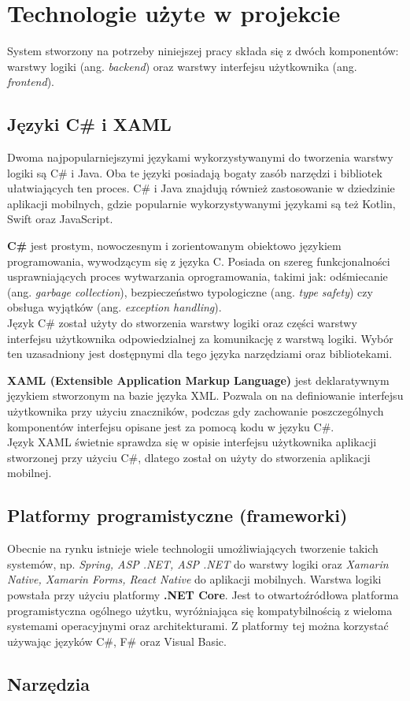 \chapter{Technologie użyte w projekcie}
System stworzony na potrzeby niniejszej pracy składa się z dwóch komponentów: warstwy logiki (ang. \textit{backend})  oraz warstwy interfejsu użytkownika (ang. \textit{frontend}).
\section{Języki C\# i XAML}
Dwoma najpopularniejszymi językami wykorzystywanymi do tworzenia warstwy logiki są C\# i Java. Oba te języki posiadają bogaty zasób narzędzi i bibliotek ułatwiających ten proces. C\# i Java znajdują również zastosowanie w dziedzinie aplikacji mobilnych, gdzie popularnie wykorzystywanymi językami są też Kotlin, Swift oraz JavaScript.

\textbf{C\#} jest prostym, nowoczesnym i zorientowanym obiektowo językiem programowania, wywodzącym się z języka C. Posiada on szereg funkcjonalności usprawniających proces wytwarzania oprogramowania, takimi jak: odśmiecanie (ang. \textit{garbage collection}), bezpieczeństwo typologiczne (ang. \textit{type safety}) czy obsługa wyjątków (ang. \textit{exception handling}).\cite{wagner_wenzel_latham_onderka_2016}\\
Język C\# został użyty do stworzenia warstwy logiki oraz części warstwy interfejsu użytkownika odpowiedzialnej za komunikację z warstwą logiki. Wybór ten uzasadniony jest dostępnymi dla tego języka narzędziami oraz bibliotekami.

\textbf{XAML (Extensible Application Markup Language)} jest deklaratywnym językiem stworzonym na bazie języka XML. Pozwala on na definiowanie interfejsu użytkownika przy użyciu znaczników, podczas gdy zachowanie poszczególnych komponentów interfejsu opisane jest za pomocą kodu w języku C\#.\cite{britch_dunn_schwelnus_2018} \\
Język XAML świetnie sprawdza się w opisie interfejsu użytkownika aplikacji stworzonej przy użyciu C\#, dlatego został on użyty do stworzenia aplikacji mobilnej.
\section{Platformy programistyczne (frameworki)}
Obecnie na rynku istnieje wiele technologii umożliwiających tworzenie takich systemów, np. \textit{Spring, ASP .NET, ASP .NET} do warstwy logiki oraz \textit{Xamarin Native, Xamarin Forms, React Native} do aplikacji mobilnych.
Warstwa logiki powstała przy użyciu platformy \textbf{.NET Core}. Jest to otwartoźródłowa platforma programistyczna ogólnego użytku, wyróżniająca się kompatybilnością z wieloma systemami operacyjnymi oraz architekturami. Z platformy tej można korzystać używając języków C\#, F\# oraz Visual Basic.
\section{Narzędzia}

